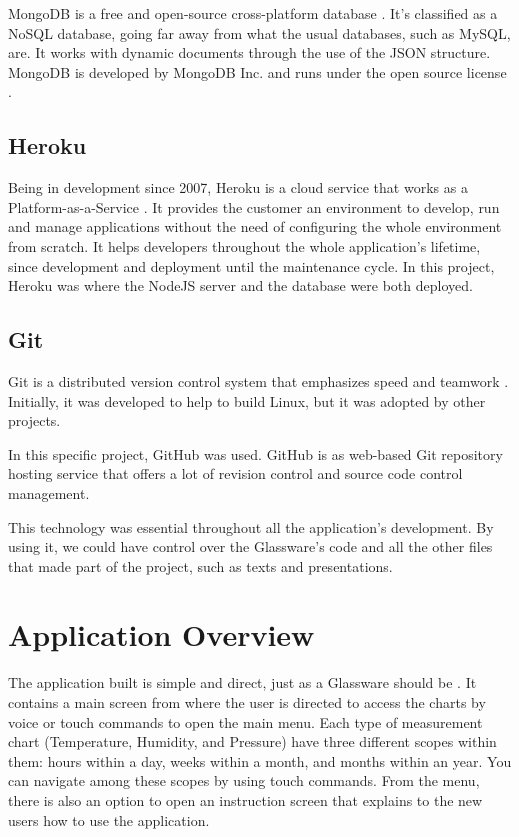 \documentclass[a4paper,11pt]{article}
\begin{document}
MongoDB is a free and open-source cross-platform database \cite{mongodb}. It’s classified as a NoSQL database, going far away from what the usual databases, such as MySQL, are. It works with dynamic documents through the use of the JSON structure. MongoDB is developed by MongoDB Inc. and runs under the open source license \cite{mongodbdocs}.

\subsection{Heroku}

Being in development since 2007, Heroku is a cloud service that works as a Platform-as-a-Service \cite{heroku}. It provides the customer an environment to develop, run and manage applications without the need of configuring the whole environment from scratch. It helps developers throughout the whole application’s lifetime, since development and deployment until the maintenance cycle. In this project, Heroku was where the NodeJS server and the database were both deployed.

\subsection{Git}

Git is a distributed version control system that emphasizes speed and teamwork \cite{git}. Initially, it was developed to help to build Linux, but it was adopted by other projects.

In this specific project, GitHub was used. GitHub is as web-based Git repository hosting service that offers a lot of revision control and source code control management. 

This technology was essential throughout all the application's development. By using it, we could have control over the Glassware’s code and all the other files that made part of the project, such as texts and presentations. 

\section{Application Overview}

The application built is simple and direct, just as a Glassware should be \cite{glassdevelopers}. It contains a main screen from where the user is directed to access the charts by voice or touch commands to open the main menu. Each type of measurement chart (Temperature, Humidity, and Pressure) have three different scopes within them: hours within a day, weeks within a month, and months within an year. You can navigate among these scopes by using touch commands. From the menu, there is also an option to open an instruction screen that explains to the new users how to use the application.
\end{document}
